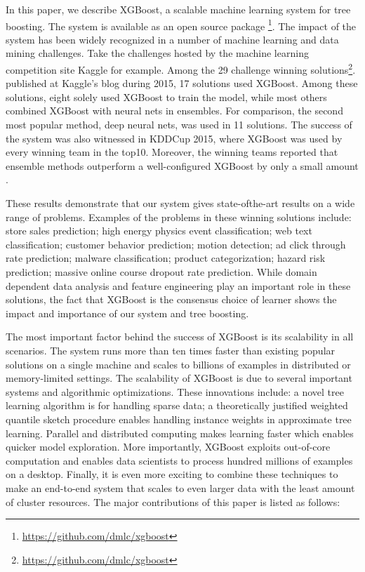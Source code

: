 \documentclass[sigconf]{acmart}
\begin{document}
In this paper, we describe XGBoost, a scalable machine learning system for tree boosting. The system is available
as an open source package \footnote{\url{https://github.com/dmlc/xgboost}}. The impact of the system has been widely recognized in a number of machine learning and
data mining challenges. Take the challenges hosted by the machine learning competition site Kaggle for example. Among 
the 29 challenge winning solutions\footnote{\url{https://github.com/dmlc/xgboost}}. published at Kaggle’s blog during 2015, 17 solutions used XGBoost. Among
these solutions, eight solely used XGBoost to train the model, while most others combined XGBoost with neural nets 
in ensembles. For comparison, the second most popular method, deep neural nets, was used in 11 solutions. The
success of the system was also witnessed in KDDCup 2015, where XGBoost was used by every winning team in the top10. 
Moreover, the winning teams reported that ensemble methods outperform a well-configured XGBoost by only a
small amount \cite{bekkerman2015present}.

These results demonstrate that our system gives state-ofthe-art results on a wide range of problems. Examples of
the problems in these winning solutions include: store sales prediction; high energy physics event classification; 
web text classification; customer behavior prediction; motion detection; ad click through rate prediction; malware 
classification; product categorization; hazard risk prediction; massive online course dropout rate prediction. 
While domain dependent data analysis and feature engineering play an important role in these solutions, 
the fact that XGBoost is the consensus choice of learner shows the impact and importance of
our system and tree boosting.

The most important factor behind the success of XGBoost is its scalability in all scenarios. The system runs more than
ten times faster than existing popular solutions on a single machine and scales to billions of examples in distributed or
memory-limited settings. The scalability of XGBoost is due to several important systems and algorithmic optimizations.
These innovations include: a novel tree learning algorithm is for handling sparse data; a theoretically justified weighted
quantile sketch procedure enables handling instance weights in approximate tree learning. Parallel and distributed 
computing makes learning faster which enables quicker model exploration. More importantly, XGBoost exploits out-of-core
computation and enables data scientists to process hundred millions of examples on a desktop. Finally, it is even more
exciting to combine these techniques to make an end-to-end system that scales to even larger data with the least amount
of cluster resources. The major contributions of this paper is listed as follows:
\end{document}
